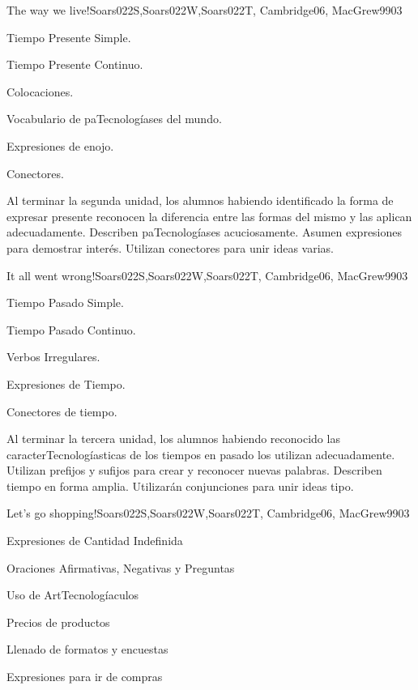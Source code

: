 \begin{syllabus}
\begin{unit}{The way we live!}{Soars022S,Soars022W,Soars022T, Cambridge06, MacGrew99}{0}{3}
   \begin{topics}
      \item Tiempo Presente Simple.
      \item Tiempo Presente Continuo.
      \item Colocaciones.
      \item Vocabulario de paTecnologíases del  mundo.
      \item Expresiones de enojo.
      \item Conectores.
   \end{topics}

   \begin{unitgoals}
      \item Al terminar la segunda unidad, los alumnos habiendo identificado la forma de expresar presente reconocen la diferencia entre las formas del mismo y las aplican adecuadamente. Describen paTecnologíases acuciosamente.  Asumen expresiones para demostrar interés. Utilizan conectores para unir ideas varias.  
   \end{unitgoals}
\end{unit}

\begin{unit}{It all went wrong!}{Soars022S,Soars022W,Soars022T, Cambridge06, MacGrew99}{0}{3}
   \begin{topics}
      \item Tiempo Pasado Simple.
      \item Tiempo Pasado Continuo.
      \item Verbos Irregulares.
      \item Expresiones de Tiempo.
      \item Conectores de tiempo.
   \end{topics}

   \begin{unitgoals}
      \item Al terminar la tercera unidad, los alumnos habiendo reconocido las caracterTecnologíasticas de los tiempos en pasado los utilizan adecuadamente. Utilizan prefijos y sufijos para crear y reconocer nuevas palabras. Describen tiempo en forma amplia. Utilizarán conjunciones para unir ideas tipo. 
   \end{unitgoals}
\end{unit}

\begin{unit}{Let's go shopping!}{Soars022S,Soars022W,Soars022T, Cambridge06, MacGrew99}{0}{3}
   \begin{topics}
      \item Expresiones de Cantidad Indefinida
      \item Oraciones Afirmativas, Negativas y Preguntas
      \item Uso de ArtTecnologíaculos
      \item Precios de productos
      \item Llenado de formatos y encuestas
      \item Expresiones para ir de compras
   \end{topics}


\end{unit}
\end{syllabus}
